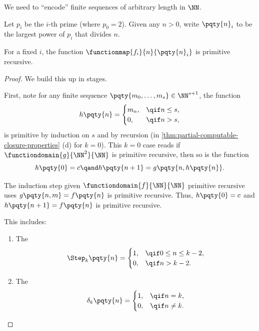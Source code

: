 We need to ``encode'' finite sequences of arbitrary length in \(\NN\).

\begin{definition}
    Let \(p_i\) be the \(i\)-th prime (where \(p_0 = 2\)). Given any \(n > 0\), write \(\pqty{n}_i\) to be the largest power of \(p_i\) that divides \(n\).
\end{definition}

\begin{lemma}
    \label{lem:prime-factorisation-encoding-primitive-recursive}%
    For a fixed \(i\), the function \(\functionmap{f_i}{n}{\pqty{n}_i}\) is primitive recursive.
\end{lemma}

\begin{proof}
    We build this up in stages.

    First, note for any finite sequence \(\pqty{m_0, \ldots, m_s} \in \NN^{s + 1}\), the function
    \[
        h\pqty{n} = \begin{cases}
            m_n, & \qif n \leq s, \\
            0, & \qif n > s,
        \end{cases}
    \]
    is primitive by induction on \(s\) and by recursion (in \autoref{thm:partial-computable-closure-properties} (d) for \(k = 0\)). This \(k = 0\) case reads if \(\functiondomain{g}{\NN^2}{\NN}\) is primitive recursive, then so is the function
    \[
        h\pqty{0} = c \qand h\pqty{n + 1} = g\pqty{n, h\pqty{n}}.
    \]

    The induction step given \(\functiondomain{f}{\NN}{\NN}\) primitive recursive uses \(g\pqty{n, m} = f\pqty{n}\) is primitive recursive. Thus, \(h\pqty{0} = c\) and \(h\pqty{n + 1} = f\pqty{n}\) is primitive recursive.

    This includes:
    \begin{enumerate}
        \item The 
        \[
            \Step_k \pqty{n} = \begin{cases}
                1, & \qif 0 \leq n \leq k - 2, \\
                0, & \qif n > k - 2.
            \end{cases}
        \]

        \item The 
        \[
            \delta_k \pqty{n} = \begin{cases}
                1, & \qif n = k, \\
                0, & \qif n \neq k.
            \end{cases}
        \]


\end{enumerate}
\end{proof}
